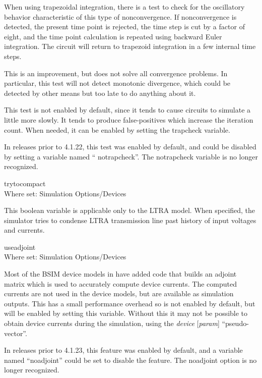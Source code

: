 \begin{description}
When using trapezoidal integration, there is a test to check for the
oscillatory behavior characteristic of this type of nonconvergence. 
If nonconvergence is detected, the present time point is rejected, the
time step is cut by a factor of eight, and the time point calculation
is repeated using backward Euler integration.  The circuit will return
to trapezoid integration in a few internal time steps.

This is an improvement, but does not solve all convergence problems. 
In particular, this test will not detect monotonic divergence, which
could be detected by other means but too late to do anything about it.

This test is not enabled by default, since it tends to cause circuits
to simulate a little more slowly.  It tends to produce false-positives
which increase the iteration count.  When needed, it can be enabled by
setting the {\et trapcheck} variable.

In {\WRspice} releases prior to 4.1.22, this test was enabled by
default, and could be disabled by setting a variable named ``{\vt
notrapcheck}''.  The {\et notrapcheck} variable is no longer
recognized.

\item{\et trytocompact}\\
Where set: {\cb Simulation Options/Devices}

This boolean variable is applicable only to the LTRA model.  When
specified, the simulator tries to condense LTRA transmission line past
history of input voltages and currents.

\item{\et useadjoint}\\
Where set: {\cb Simulation Options/Devices}

Most of the BSIM device models in {\WRspice} have added code that
builds an adjoint matrix which is used to accurately compute device
currents.  The computed currents are not used in the device models,
but are available as simulation outputs.  This has a small performance
overhead so is not enabled by default, but will be enabled by setting
this variable.  Without this it may not be possible to obtain device
currents during the simulation, using the {\vt \@}{\it device\/}{\vt
[}{\it param\/}{\vt ]} ``pseudo-vector''.

In {\WRspice} releases prior to 4.1.23, this feature was enabled by
default, and a variable named ``{\et noadjoint}'' could be set to
disable the feature.  The {\et noadjoint} option is no longer
recognized.
\end{description}

